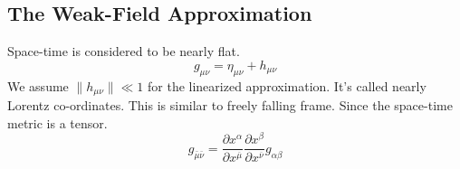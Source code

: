 \documentclass[12pt, a4paper]{article}
\theoremstyle{plain}
\theoremstyle{definition}
\theoremstyle{remark}
\begin{document}
\subsection{The Weak-Field Approximation}
\label{subsec:The Weak-Field Approximation}
Space-time is considered to be nearly flat. 
\begin{equation}
  g_{\mu \nu}=\eta_{\mu \nu}+h_{\mu \nu}
  \label{eq: Perturbation}
\end{equation}
We assume $ \|h_{\mu\nu}\| \ll 1 $ for the linearized approximation. It's called nearly Lorentz co-ordinates. This is similar to freely falling frame.
Since the space-time metric is a tensor.
\begin{equation}
    g_{{\bar{\mu}} {\bar{\nu}} }=\frac{\partial x^\alpha}{\partial x^{\overline{\mu}}}\frac{\partial x^\beta}{\partial x^{\overline{\nu}}}g_{\alpha \beta}
    \label{eq: Perturbation}
\end{equation}
\end{document}
